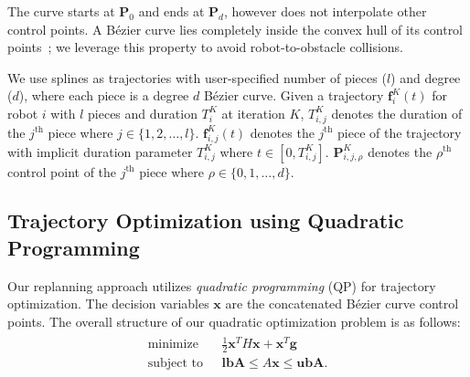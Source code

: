 \documentclass{svproc}
\newcommand{\vP}{\mathbf{P}}
\newcommand{\vg}{\mathbf{g}}
\newcommand{\vf}{\mathbf{f}}
\newcommand{\vw}{\mathbf{w}}
\newcommand{\vx}{\mathbf{x}}
\newcommand{\vlbA}{\mathbf{lbA}}
\newcommand{\vubA}{\mathbf{ubA}}
\newcommand{\vlb}{\mathbf{lb}}
\newcommand{\vub}{\mathbf{ub}}
\newcommand{\R}{\mathbb{R}} %
\renewcommand{\th}{^{\text{th}}}
\begin{document}
The curve starts at $\vP_0$ and ends at $\vP_d$, however does not interpolate other control points.
A B\'ezier curve lies completely inside the convex hull of its control points~\cite{Bernstein};
we leverage this property to avoid robot-to-obstacle collisions.

We use splines as trajectories with user-specified number of pieces ($l$) and degree ($d$), where each piece is a degree $d$ B\'ezier curve.
Given a trajectory $\vf^{K}_i(t)$ for robot $i$ with $l$ pieces and duration $T^{K}_i$ at iteration $K$, $T^{K}_{i,j}$ denotes the duration of the $j\th$ piece where $j \in \{1,2,\ldots,l\}$.
$\vf^{K}_{i,j}(t)$ denotes the $j\th$ piece of the trajectory with implicit duration parameter $T^K_{i,j}$ where $t\in[0, T^{K}_{i,j}]$. $\vP^{K}_{i,j,\rho}$ denotes the $\rho\th$ control point of the $j\th$ piece where $\rho \in \{0,1,\ldots,d\}$.



\subsection{Trajectory Optimization using Quadratic Programming} \label{trajectoryOptimization}
Our replanning approach utilizes \emph{quadratic programming} (QP) for trajectory optimization.
The decision variables $\vx$ are the concatenated B\'ezier curve control points.
The overall structure of our quadratic optimization problem is as follows:
\begin{align}
\begin{split}
    \text{minimize}\ \ \ &\frac{1}{2}\vx^TH\vx + \vx^T\vg\\
    \text{subject to}\ \ \ & \vlbA \leq A\vx \leq \vubA.
\end{split}
\end{align}
\end{document}
